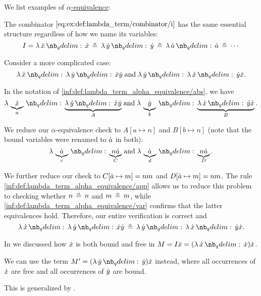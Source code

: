 \begin{example}\label{ex:def:lambda_term_alpha_equivalence}
  We list examples of \hyperref[def:lambda_term_alpha_equivalence]{\( \alpha \)-equivalence}:
  \begin{thmenum}
     The combinator \( \ref{eq:ex:def:lambda_term/combinator/i} \) has the same essential structure regardless of how we name its variables:
    \begin{equation*}
      I = \qabs \synx \synx \aequiv \qabs \syny \syny \aequiv \qabs \syna \syna \aequiv \cdots
    \end{equation*}

     Consider a more complicated case:
    \begin{equation*}
      \qabs \synx \qabs \syny \synx \syny
      \T{and}
      \qabs \syny \qabs \synx \syny \synx.
    \end{equation*}

    In the notation of \ref{inf:def:lambda_term_alpha_equivalence/abs}, we have
    \begin{equation*}
      \qabs {\underbrace{\synx}_a} \underbrace{\qabs \syny \synx \syny}_A
      \T{and}
      \qabs {\underbrace{\syny}_b} \underbrace{\qabs \synx \syny \synx}_B.
    \end{equation*}

    We reduce our \( \alpha \)-equivalence check to \( A[a \mapsto n] \) and \( B[b \mapsto n] \) (note that the bound variables were renamed to \( {\dot{a}} \) in both):
    \begin{equation*}
      \qabs {\underbrace{\syna}_c} \underbrace{n \syna}_C
      \T{and}
      \qabs {\underbrace{\syna}_d} \underbrace{n \syna}_D.
    \end{equation*}

    We further reduce our check to \( C[{\dot{a}} \mapsto m] = nm \) and \( D[{\dot{a}} \mapsto m] = nm \). The rule \ref{inf:def:lambda_term_alpha_equivalence/app} allows us to reduce this problem to checking whether \( n \aequiv n \) and \( m \aequiv m \), while \ref{inf:def:lambda_term_alpha_equivalence/var} confirms that the latter equivalences hold. Therefore, our entire verification is correct and
    \begin{equation*}
      \qabs \synx \qabs \syny \synx \syny \aequiv \qabs \syny \qabs \synx \syny \synx.
    \end{equation*}

     In  we discussed how \( {\dot{x}} \) is both bound and free in \( M = I \synx = (\qabs \synx \synx) \synx \).

    We can use the term \( M' = (\qabs \syny \syny) \synx \) instead, where all occurrences of \( {\dot{x}} \) are free and all occurrences of \( {\dot{y}} \) are bound.

    This is generalized by .
  \end{thmenum}
\end{example}

